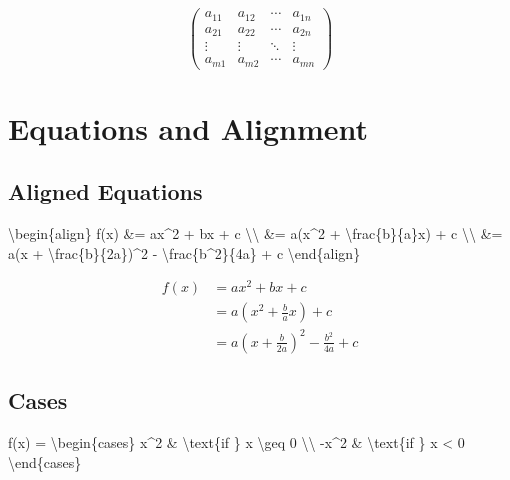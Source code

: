 \documentclass[
  letterpaper,
  DIV=11,
  numbers=noendperiod]{scrartcl}
\newenvironment{Shaded}{\begin{snugshade}}{\end{snugshade}}
\newcommand{\ExtensionTok}[1]{\textcolor[rgb]{0.00,0.23,0.31}{#1}}
\newcommand{\KeywordTok}[1]{\textcolor[rgb]{0.00,0.23,0.31}{#1}}
\newcommand{\NormalTok}[1]{\textcolor[rgb]{0.00,0.23,0.31}{#1}}
\newcommand{\SpecialCharTok}[1]{\textcolor[rgb]{0.37,0.37,0.37}{#1}}
\newcommand{\SpecialStringTok}[1]{\textcolor[rgb]{0.13,0.47,0.30}{#1}}
\begin{document}
\[\begin{pmatrix}
a_{11} & a_{12} & \cdots & a_{1n} \\
a_{21} & a_{22} & \cdots & a_{2n} \\
\vdots & \vdots & \ddots & \vdots \\
a_{m1} & a_{m2} & \cdots & a_{mn}
\end{pmatrix}\]

\hypertarget{equations-and-alignment}{%
\section{Equations and Alignment}\label{equations-and-alignment}}

\hypertarget{aligned-equations}{%
\subsection{Aligned Equations}\label{aligned-equations}}

\begin{Shaded}
\begin{Highlighting}[]
\SpecialStringTok{$$}\KeywordTok{\textbackslash{}begin}\NormalTok{\{}\ExtensionTok{align}\NormalTok{\}}
\SpecialStringTok{f(x) \&= ax\^{}2 + bx + c }\SpecialCharTok{\textbackslash{}\textbackslash{}}
\SpecialStringTok{\&= a(x\^{}2 + }\SpecialCharTok{\textbackslash{}frac}\SpecialStringTok{\{b\}\{a\}x) + c }\SpecialCharTok{\textbackslash{}\textbackslash{}}
\SpecialStringTok{\&= a(x + }\SpecialCharTok{\textbackslash{}frac}\SpecialStringTok{\{b\}\{2a\})\^{}2 {-} }\SpecialCharTok{\textbackslash{}frac}\SpecialStringTok{\{b\^{}2\}\{4a\} + c}
\KeywordTok{\textbackslash{}end}\NormalTok{\{}\ExtensionTok{align}\NormalTok{\}}\SpecialStringTok{$$}
\end{Highlighting}
\end{Shaded}

\[\begin{align}
f(x) &= ax^2 + bx + c \\
&= a(x^2 + \frac{b}{a}x) + c \\
&= a(x + \frac{b}{2a})^2 - \frac{b^2}{4a} + c
\end{align}\]

\hypertarget{cases}{%
\subsection{Cases}\label{cases}}

\begin{Shaded}
\begin{Highlighting}[]
\SpecialStringTok{$$f(x) = }\KeywordTok{\textbackslash{}begin}\NormalTok{\{}\ExtensionTok{cases}\NormalTok{\}}
\SpecialStringTok{x\^{}2 \& }\SpecialCharTok{\textbackslash{}text}\NormalTok{\{if \}}\SpecialStringTok{ x }\SpecialCharTok{\textbackslash{}geq}\SpecialStringTok{ 0 }\SpecialCharTok{\textbackslash{}\textbackslash{}}
\SpecialStringTok{{-}x\^{}2 \& }\SpecialCharTok{\textbackslash{}text}\NormalTok{\{if \}}\SpecialStringTok{ x \textless{} 0}
\KeywordTok{\textbackslash{}end}\NormalTok{\{}\ExtensionTok{cases}\NormalTok{\}}\SpecialStringTok{$$}
\end{Highlighting}
\end{Shaded}
\end{document}
